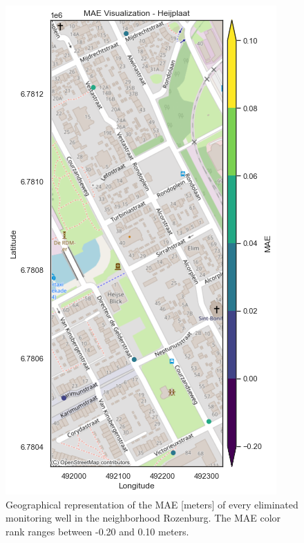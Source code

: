 \begin{figure}[htbp]
    \centering
    \includegraphics[width=0.50\linewidth]{37maeheij.png}
    \caption{Geographical representation of the MAE [meters] of every eliminated monitoring well in the neighborhood Rozenburg. The MAE color rank ranges between -0.20 and 0.10 meters.}
    \label{fig:enter-label}
\end{figure}
\clearpage
